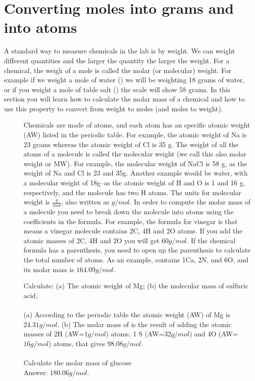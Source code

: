 \documentclass[main.tex]{subfiles}
\begin{document}
\section{Converting moles into grams and into atoms}
A standard way to measure chemicals in the lab is by weight. We can weight different quantities and the larger the quantity the larger the weight. For a chemical, the weigh of a mole is called the molar (or molecular) weight. For example if we weight a mole of water () we will be weighting 18 grams of water, or if you weight a mole of table salt () the scale will show 58 grams. In this section you will learn how to calculate the molar mass of a chemical and how to use this property to convert from weight to moles (and moles to weight).
\sloppy 
\begin{description}
\item[] Chemicals are made of atoms, and each atom has an specific atomic weight (AW) listed in the periodic table. For example, the atomic weight of Na is 23 grams whereas the atomic weight of Cl is 35 g. The weight of all the atoms of a molecule is called the molecular weight (we call this also molar weight or MW). For example, the molecular weight of NaCl is 58 g, as the weight of Na and Cl is 23 and 35g. Another example would be water,  with a molecular weight of 18g--as the atomic weight of H and O is 1 and 16 g, respectively, and the molecule has two H atoms. The units for molecular weight is $\frac{g}{mol}$, also written as $g/mol$. In order to compute the molar mass of a molecule you need to break down the molecule into atoms using the coefficients in the formula. For example, the formula for vinegar is  that means a vinegar molecule contains 2C, 4H and 2O atoms. If you add the atomic masses of 2C, 4H and 2O you will get $60g/mol$. If the chemical formula has a parenthesis, you need to open up the parenthesis to calculate the total number of atoms. As an example,  contains 1Ca, 2N, and 6O, and its molar mass is $164.09g/mol$.

\begin{example} %
Calculate: (a) The atomic weight of Mg; (b) the molecular mass of sulfuric acid,  \\
\\
(a) According to the periodic table the atomic weight (AW) of Mg is $24.31g/mol$. (b) The molar mass of  is the result of adding the atomic masses of 2H (AW=$1g/mol$) atoms, 1 S (AW=$32g/mol$) and 4O (AW=$16g/mol$)  atoms, that gives $98.08g/mol$.\\
\faDiamond\ \\
Calculate the molar mass of glucose \\
\flushright Answer: $180.06g/mol$.
\end{example}%




\end{description}
\end{document}
